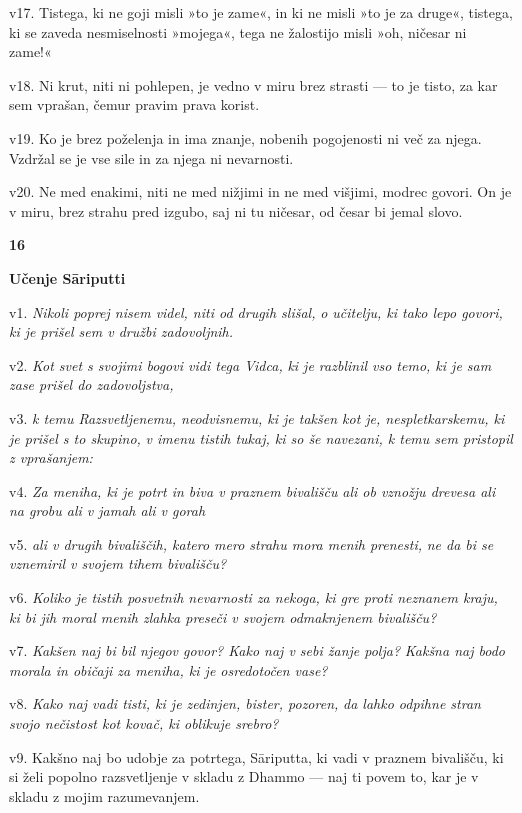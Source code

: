 v17. Tistega, ki ne goji misli »to je zame«, in ki ne misli »to je za druge«, tistega, ki se zaveda nesmiselnosti »mojega«, tega ne žalostijo misli »oh, ničesar ni zame!«

v18. Ni krut, niti ni pohlepen, je vedno v miru brez strasti --- to je tisto, za kar sem vprašan, čemur pravim prava korist.

v19. Ko je brez poželenja in ima znanje, nobenih pogojenosti ni več za njega. Vzdržal se je vse sile in za njega ni nevarnosti.

v20. Ne med enakimi, niti ne med nižjimi in ne med višjimi, modrec govori. On je v miru, brez strahu pred izgubo, saj ni tu ničesar, od česar bi jemal slovo.

\textbf{16 }

\textbf{Učenje Sāriputti }

v1. \emph{Nikoli poprej nisem videl, niti od drugih slišal,} \emph{o učitelju, ki tako lepo govori, ki je prišel sem v družbi zadovoljnih.}

v2. \emph{Kot svet s svojimi bogovi vidi tega Vidca,} \emph{ki je razblinil vso temo, ki je sam zase prišel do zadovoljstva,}

v3. \emph{k temu Razsvetljenemu, neodvisnemu, ki je takšen kot je, nespletkarskemu, ki je prišel s to skupino,} \emph{v imenu tistih tukaj, ki so še navezani, k temu sem pristopil z vprašanjem:}

v4. \emph{Za meniha, ki je potrt in biva v praznem bivališču} \emph{ali ob vznožju drevesa ali na grobu ali v jamah ali v gorah}

v5. \emph{ali v drugih bivališčih, katero mero strahu mora menih prenesti,} \emph{ne da bi se vznemiril v svojem tihem bivališču?}

v6. \emph{Koliko je tistih posvetnih nevarnosti za nekoga, ki gre proti neznanem kraju,} \emph{ki bi jih moral menih zlahka preseči v svojem odmaknjenem bivališču?}

v7. \emph{Kakšen naj bi bil njegov govor? Kako naj v sebi žanje polja?} \emph{Kakšna naj bodo morala in običaji za meniha, ki je osredotočen vase?}

v8. \emph{Kako naj vadi tisti, ki je zedinjen, bister, pozoren,} \emph{da lahko odpihne stran svojo nečistost kot kovač, ki oblikuje srebro?}

v9. Kakšno naj bo udobje za potrtega, Sāriputta, ki vadi v praznem bivališču, ki si želi popolno razsvetljenje v skladu z Dhammo --- naj ti povem to, kar je v skladu z mojim razumevanjem.

